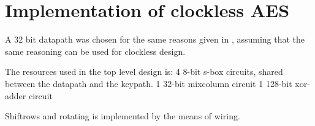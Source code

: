 \section{Implementation of clockless AES}

A 32 bit datapath was chosen for the same reasons given in
\cite{ekelund}, assuming that the same reasoning can be used for
clockless design.

The resources used in the top level design is:
 4 8-bit s-box circuits, shared between the datapath and the keypath.
 1 32-bit mixcolumn circuit
 1 128-bit xor-adder circuit

Shiftrows and rotating is implemented by the means of wiring.


 
